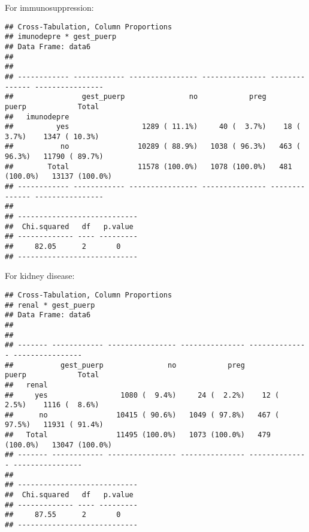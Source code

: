 \documentclass[
]{article}
\newenvironment{Shaded}{\begin{snugshade}}{\end{snugshade}}
\newcommand{\DataTypeTok}[1]{\textcolor[rgb]{0.13,0.29,0.53}{#1}}
\newcommand{\KeywordTok}[1]{\textcolor[rgb]{0.13,0.29,0.53}{\textbf{#1}}}
\newcommand{\NormalTok}[1]{#1}
\newcommand{\OperatorTok}[1]{\textcolor[rgb]{0.81,0.36,0.00}{\textbf{#1}}}
\newcommand{\OtherTok}[1]{\textcolor[rgb]{0.56,0.35,0.01}{#1}}
\newcommand{\StringTok}[1]{\textcolor[rgb]{0.31,0.60,0.02}{#1}}
\begin{document}
For immunosuppression:

\begin{Shaded}
\end{Shaded}

\begin{verbatim}
## Cross-Tabulation, Column Proportions  
## imunodepre * gest_puerp  
## Data Frame: data6  
## 
## 
## ------------ ------------ ---------------- --------------- -------------- ----------------
##                gest_puerp               no            preg          puerp            Total
##   imunodepre                                                                              
##          yes                 1289 ( 11.1%)     40 (  3.7%)    18 (  3.7%)    1347 ( 10.3%)
##           no                10289 ( 88.9%)   1038 ( 96.3%)   463 ( 96.3%)   11790 ( 89.7%)
##        Total                11578 (100.0%)   1078 (100.0%)   481 (100.0%)   13137 (100.0%)
## ------------ ------------ ---------------- --------------- -------------- ----------------
## 
## ----------------------------
##  Chi.squared   df   p.value 
## ------------- ---- ---------
##     82.05      2       0    
## ----------------------------
\end{verbatim}

For kidney disease:

\begin{Shaded}
\end{Shaded}

\begin{verbatim}
## Cross-Tabulation, Column Proportions  
## renal * gest_puerp  
## Data Frame: data6  
## 
## 
## ------- ------------ ---------------- --------------- -------------- ----------------
##           gest_puerp               no            preg          puerp            Total
##   renal                                                                              
##     yes                 1080 (  9.4%)     24 (  2.2%)    12 (  2.5%)    1116 (  8.6%)
##      no                10415 ( 90.6%)   1049 ( 97.8%)   467 ( 97.5%)   11931 ( 91.4%)
##   Total                11495 (100.0%)   1073 (100.0%)   479 (100.0%)   13047 (100.0%)
## ------- ------------ ---------------- --------------- -------------- ----------------
## 
## ----------------------------
##  Chi.squared   df   p.value 
## ------------- ---- ---------
##     87.55      2       0    
## ----------------------------
\end{verbatim}
\end{document}
